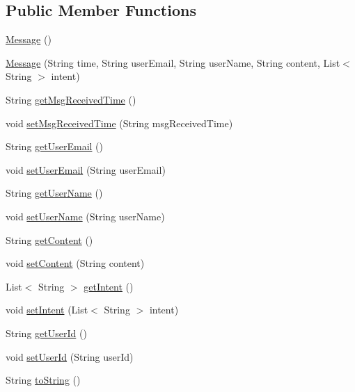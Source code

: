 \subsection*{Public Member Functions}
\begin{DoxyCompactItemize}
\item 
\hyperlink{classedu_1_1sjsu_1_1amigo_1_1mp_1_1kafka_1_1_message_ad82e52562c76f636a7fed853011bfb58}{Message} ()
\item 
\hyperlink{classedu_1_1sjsu_1_1amigo_1_1mp_1_1kafka_1_1_message_a07afa911fb18e10786acc2a48f056a55}{Message} (String time, String user\+Email, String user\+Name, String content, List$<$ String $>$ intent)
\item 
String \hyperlink{classedu_1_1sjsu_1_1amigo_1_1mp_1_1kafka_1_1_message_a36e5e0185f98a39c3a320ecda92e198b}{get\+Msg\+Received\+Time} ()
\item 
void \hyperlink{classedu_1_1sjsu_1_1amigo_1_1mp_1_1kafka_1_1_message_a7d7682afca7e163c5d18d88e44997ef7}{set\+Msg\+Received\+Time} (String msg\+Received\+Time)
\item 
String \hyperlink{classedu_1_1sjsu_1_1amigo_1_1mp_1_1kafka_1_1_message_ab0152afc118f2419f176ff9da5d10729}{get\+User\+Email} ()
\item 
void \hyperlink{classedu_1_1sjsu_1_1amigo_1_1mp_1_1kafka_1_1_message_a794f8d4101411ecee9fe07f704e3f1f4}{set\+User\+Email} (String user\+Email)
\item 
String \hyperlink{classedu_1_1sjsu_1_1amigo_1_1mp_1_1kafka_1_1_message_a417ffc1428f5c212ce9ecca3b1ea9265}{get\+User\+Name} ()
\item 
void \hyperlink{classedu_1_1sjsu_1_1amigo_1_1mp_1_1kafka_1_1_message_a23ef3ab25dad5c06740a4bff403030a6}{set\+User\+Name} (String user\+Name)
\item 
String \hyperlink{classedu_1_1sjsu_1_1amigo_1_1mp_1_1kafka_1_1_message_a059c4a2eb1ec29f720a5de312658e953}{get\+Content} ()
\item 
void \hyperlink{classedu_1_1sjsu_1_1amigo_1_1mp_1_1kafka_1_1_message_a3055123d7c4e5a480dfaa5c106c38cf9}{set\+Content} (String content)
\item 
List$<$ String $>$ \hyperlink{classedu_1_1sjsu_1_1amigo_1_1mp_1_1kafka_1_1_message_a02741708a738f74bf41e744d62e93599}{get\+Intent} ()
\item 
void \hyperlink{classedu_1_1sjsu_1_1amigo_1_1mp_1_1kafka_1_1_message_a6ad0370cf5e5abfa0dd6abc480b5a0a3}{set\+Intent} (List$<$ String $>$ intent)
\item 
String \hyperlink{classedu_1_1sjsu_1_1amigo_1_1mp_1_1kafka_1_1_message_a47522ca9758906f0c1c10f9515561000}{get\+User\+Id} ()
\item 
void \hyperlink{classedu_1_1sjsu_1_1amigo_1_1mp_1_1kafka_1_1_message_aabd0791c52c85bc2f2830462d8f8b3a0}{set\+User\+Id} (String user\+Id)
\item 
String \hyperlink{classedu_1_1sjsu_1_1amigo_1_1mp_1_1kafka_1_1_message_a7788b925c3ded0309bd31e036224ca9b}{to\+String} ()
\end{DoxyCompactItemize}


